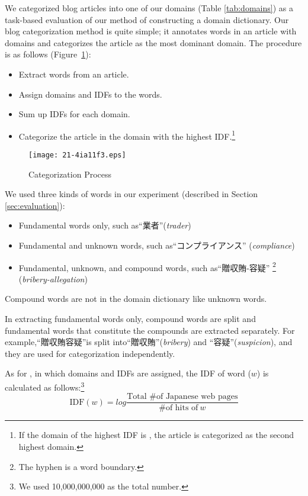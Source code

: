 \documentclass[english]{jnlp_1.4_rep}
\newcommand{\dom}[1]{}
\newcommand{\Bangou}[1]{}
\begin{document}
We categorized blog articles into one of our domains
(Table \ref{tab:domains}) as a task-based evaluation of our method of
constructing a domain dictionary.
Our blog categorization method is quite simple;
it annotates words in an article with domains and categorizes the article
as the most dominant domain.
The procedure is as follows (Figure~\ref{categorization-pic}):
\begin{itemize}
 \item[\Bangou{1}] Extract words from an article.
 \item[\Bangou{2}] Assign domains and IDFs to the words.
 \item[\Bangou{3}] Sum up IDFs for each domain.
 \item[\Bangou{4}] Categorize the article in the domain with the highest
	    IDF.\footnote{If the domain of the highest IDF is
	    \dom{nodomain}, the article is categorized as the second
	    highest domain.}
\end{itemize}

\begin{figure}[b]
\begin{center}
\texttt{[image: 21-4ia11f3.eps]}
\end{center}
\caption{Categorization Process}
\label{categorization-pic}
\vspace{-1\Cvs}
\end{figure}

We used three kinds of words in our experiment (described in
Section \ref{sec:evaluation}):
\begin{itemize}
 \item Fundamental words only, such as“業者”(\textit{trader})
 \item Fundamental and unknown words, such as“コンプライアンス”
       (\textit{compliance})
 \item Fundamental, unknown, and compound words, such as“贈収賄-容疑”
       \footnote{The hyphen is a word boundary.}
       (\textit{bribery-allegation})
\end{itemize}
Compound words are not in the domain dictionary like unknown words.

In extracting fundamental words only, compound words are
split and fundamental words that constitute the compounds are extracted
separately. 
For example,“贈収賄容疑”is split into“贈収賄”(\textit{bribery}) and
“容疑”(\textit{suspicion}), and they are used for categorization
independently. 

As for \Bangou{2}, in which domains and IDFs are assigned, the IDF of
word ($w$) is calculated as follows:\footnote{
We used 10,000,000,000 as the total number.
}
\begin{equation}
\mathrm{IDF}(w)=\mathit{log}\frac{\text{Total \# of Japanese web pages}}{\text{\# of hits of}~w}
\end{equation}
\end{document}

